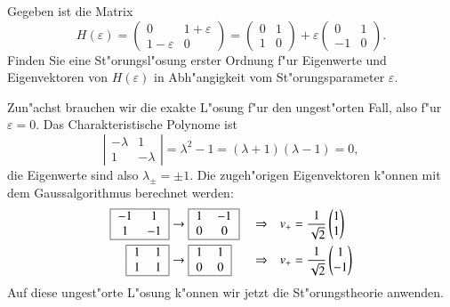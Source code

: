 Gegeben ist die Matrix
\[
H(\varepsilon)
=
\begin{pmatrix}0&1+\varepsilon\\1-\varepsilon&0\end{pmatrix}
=
\begin{pmatrix}0&1\\1&0\end{pmatrix}
+
\varepsilon
\begin{pmatrix}0&1\\-1&0\end{pmatrix}
.
\]
Finden Sie eine St"orungsl"osung erster Ordnung f"ur Eigenwerte und
Eigenvektoren von $H(\varepsilon)$ in Abh"angigkeit vom St"orungsparameter
$\varepsilon$.

\begin{loesung}
Zun"achst brauchen wir die exakte L"osung f"ur den ungest"orten Fall,
also f"ur $\varepsilon=0$. Das Charakteristische Polynome ist
\[
\left|
\begin{matrix}-\lambda&1\\1&-\lambda\end{matrix}
\right|
=\lambda^2-1=(\lambda+1)(\lambda-1)=0,
\]
die Eigenwerte sind also $\lambda_\pm=\pm 1$. Die zugeh"origen
Eigenvektoren k"onnen mit dem Gaussalgorithmus berechnet werden:
\[
\begin{aligned}
\begin{tabular}{|>{$}c<{$}>{$}c<{$}|}
\hline
-1&1\\
1&-1\\
\hline
\end{tabular}
&\rightarrow
\begin{tabular}{|>{$}c<{$}>{$}c<{$}|}
\hline
1&-1\\
0&0\\
\hline
\end{tabular}
&&\Rightarrow&
v_+&=\frac1{\sqrt{2}}\begin{pmatrix}1\\1\end{pmatrix}
\\
\begin{tabular}{|>{$}c<{$}>{$}c<{$}|}
\hline
1&1\\
1&1\\
\hline
\end{tabular}
&\rightarrow
\begin{tabular}{|>{$}c<{$}>{$}c<{$}|}
\hline
1&1\\
0&0\\
\hline
\end{tabular}
&&\Rightarrow&
v_+&=\frac1{\sqrt{2}}\begin{pmatrix}1\\-1\end{pmatrix}
\end{aligned}
\]
Auf diese ungest"orte L"osung k"onnen wir jetzt die St"orungstheorie
anwenden.


\end{loesung}
